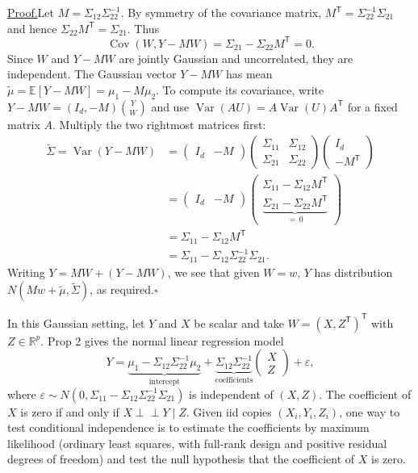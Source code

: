 \documentclass[11pt,a4paper]{article}
\begin{document}
\noindent\underline{Proof.}\quad Let $M=\Sigma_{12}\Sigma_{22}^{-1}$.
By symmetry of the covariance matrix,
$M^{\mathsf T}=\Sigma_{22}^{-1}\Sigma_{21}$ and hence
$\Sigma_{22}M^{\mathsf T}=\Sigma_{21}$. Thus
\[
\operatorname{Cov}(W,Y-MW)=\Sigma_{21}-\Sigma_{22}M^{\mathsf T}=0.
\]
Since $W$ and $Y-MW$ are jointly Gaussian and uncorrelated, they are
independent. The Gaussian vector $Y-MW$ has mean
$\tilde\mu=\mathbb E[Y-MW]=\mu_1-M\mu_2$. To compute its covariance,
write $Y-MW=(I_d,-M)\binom{Y}{W}$ and use
$\operatorname{Var}(AU)=A\operatorname{Var}(U)A^{\mathsf T}$
for a fixed matrix $A$. Multiply the two rightmost matrices first:
\[
\begin{aligned}
\tilde\Sigma
=\operatorname{Var}(Y-MW)
&=\begin{pmatrix}I_d&-M\end{pmatrix}
  \begin{pmatrix}
  \Sigma_{11}&\Sigma_{12}\\
  \Sigma_{21}&\Sigma_{22}
  \end{pmatrix}
  \begin{pmatrix}I_d\\-M^{\mathsf T}\end{pmatrix}\\[4pt]
&=\begin{pmatrix}I_d&-M\end{pmatrix}
  \begin{pmatrix}
  \Sigma_{11}-\Sigma_{12}M^{\mathsf T}\\
  \underbrace{\Sigma_{21}-\Sigma_{22}M^{\mathsf T}}_{=\,0}
  \end{pmatrix}\\[4pt]
&=\Sigma_{11}-\Sigma_{12}M^{\mathsf T}\\
&=\boxed{\Sigma_{11}-\Sigma_{12}\Sigma_{22}^{-1}\Sigma_{21}}.
\end{aligned}
\]
Writing $Y=MW+(Y-MW)$, we see that given $W=w$, $Y$ has distribution
$N(Mw+\tilde\mu,\tilde\Sigma)$, as required.\hfill$\square$

In this Gaussian setting, let $Y$ and $X$ be scalar and take
$W=(X,Z^{\mathsf T})^{\mathsf T}$ with $Z\in\mathbb R^p$.
Prop 2 gives the normal linear regression model
\[
Y=\underbrace{\mu_1-\Sigma_{12}\Sigma_{22}^{-1}\mu_2}_{\text{intercept}}
+\underbrace{\Sigma_{12}\Sigma_{22}^{-1}}_{\text{coefficients}}
\begin{pmatrix}X\\ Z\end{pmatrix}+\varepsilon,
\]
where $\varepsilon\sim
N(0,\Sigma_{11}-\Sigma_{12}\Sigma_{22}^{-1}\Sigma_{21})$ is independent
of $(X,Z)$. The coefficient of $X$ is zero if and only if
$X\perp\!\!\!\perp Y\mid Z$. Given iid copies $(X_i,Y_i,Z_i)$, one way
to test conditional independence is to estimate the coefficients by
maximum likelihood (ordinary least squares, with full-rank design and
positive residual degrees of freedom) and test the null hypothesis that
the coefficient of $X$ is zero.
\end{document}
